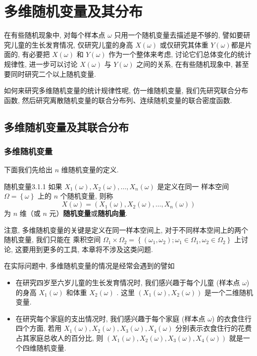 
\chapter{多维随机变量及其分布}\label{cha:3}
在有些随机现象中, 对每个样本点 $\omega$ 只用一个随机变量去描述是不够的, 
譬如要研究儿童的生长发育情况, 仅研究儿童的身高 $X(\omega)$ 或仅研究其体重 $Y(\omega)$都是片面的, 
有必要把 $X(\omega)$ 和 $Y(\omega)$ 作为一个整体来考虑, 讨论它们总体变化的统计规律性, 
进一步可以讨论 $X(\omega)$ 与 $Y(\omega)$ 之间的关系, 在有些随机现象中, 甚至要同时研究二个以上随机变量. 

如何来研究多维随机变量的统计规律性呢, 仿一维随机变量, 我们先研究联合分布函数, 
然后研究离散随机变量的联合分布列、连续随机变量的联合密度函数. 

\section{多维随机变量及其联合分布}\label{sec:3.1}

\subsection{多维随机变量}\label{ssec:3.1.1}
下面我们先给出 $n$ 维随机变量的定义. 
\begin{definition}{随机变量}{3.1.1}
	如果 $X_1(\omega),X_2(\omega),\ldots,X_n(\omega)$ 是定义在同一
	样本空间 $\Omega=\left\{\omega\right\}$ 上的 $n$ 个随机变量, 则称
	\[
	X(\omega)=(X_1(\omega),X_2(\omega),\ldots,X_n(\omega))
	\]
	为 $n$ 维（或 $n$ 元）\textbf{随机变量}或\textbf{随机向量}. 
\end{definition}
注意, 多维随机变量的关键是定义在同一样本空间上, 对于不同样本空间上的两个随机变量, 我们只能在
乘积空间 $\Omega_1\times \Omega_2=\left\{(\omega_1,\omega_2);\omega_1 \in \Omega_1,\omega_2 \in \Omega_2 \right\}$ 上讨论, 
 这要用到更多的工具, 本章将不涉及这类问题. 
      
 在实际问题中, 多维随机变量的情况是经常会遇到的譬如
  \begin{itemize}
  	\item 在研究四岁至六岁儿童的生长发育情况时, 我们感兴趣于每个儿童 (样本点 $\omega$) 的身高 $X_1(\omega)$ 
  	和体重 $X_2(\omega)$ . 这里 $(X_1(\omega),X_2(\omega))$ 是一个二维随机变量. 
  	\item 在研究每个家庭的支出情况时, 我们感兴趣于每个家庭 (样本点 $\omega$) 的衣食住行四个方面, 
  	若用 $X_1(\omega),X_2(\omega),X_3(\omega),X_4(\omega)$ 分别表示衣食住行的花费占其家庭总收人的百分比, 
  	则 $(X_1(\omega),X_2(\omega),X_3(\omega),X_4(\omega))$ 就是一个四维随机变量. 
  \end{itemize}

